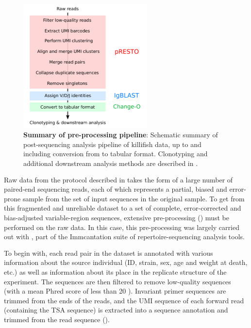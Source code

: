 \begin{figure}
\centering
\includegraphics[width=0.6\textwidth]{_Figures/png_edited/igseq-preprocessing}
\caption[Summary of \igseq pre-processing pipeline]{\textbf{Summary of \igseq pre-processing pipeline}: Schematic summary of post-sequencing analysis pipeline of killifish \igseq data, up to and including conversion from  to  tabular format. Clonotyping and additional downstream analysis methods are described in .}
\label{fig:igrace-preprocessing}
\vspace{0.5em}
\end{figure}

Raw \igseq data from the protocol described in  takes the form of a large number of paired-end sequencing reads, each of which represents a partial, biased and error-prone sample from the set of input sequences in the original sample. To get from this fragmented and unreliable dataset to a set of complete, error-corrected and bias-adjusted \igh{} variable-region sequences, extensive pre-processing () must be performed on the raw data. In this case, this pre-processing was largely carried out with  \parencite{vanderheiden2014presto}, part of the Immcantation suite of repertoire-sequencing analysis tools.

To begin with, each read pair in the dataset is annotated with various information about the source individual (ID, strain, sex, age and weight at death, etc.) as well as information about its place in the replicate structure of the experiment. The sequences are then filtered to remove low-quality sequences (with a mean Phred score of less than 20 \parencite{ewing1998phred}). Invariant primer sequences are trimmed from the ends of the reads, and the UMI sequence of each forward read (containing the TSA sequence) is extracted into a sequence annotation and trimmed from the read sequence ().

